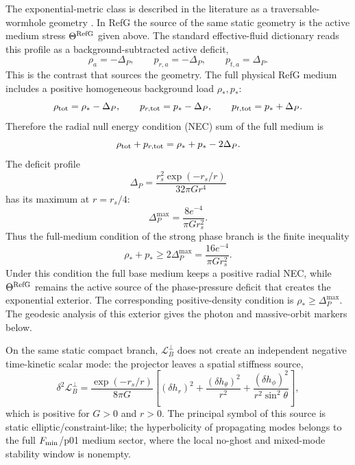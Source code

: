 \documentclass[12pt]{article}
\begin{document}
The exponential-metric class is described in the literature as a traversable-wormhole geometry \cite{Boonserm2018}. In RefG the source of the same static geometry is the active medium stress $\Theta^{\rm RefG}$ given above. The standard effective-fluid dictionary reads this profile as a background-subtracted active deficit,
\begin{equation}
\rho_a=-\Delta_P,\qquad p_{r,a}=-\Delta_P,\qquad p_{t,a}=\Delta_P .
\end{equation}
This is the contrast that sources the geometry. The full physical RefG medium includes a positive homogeneous background load $\rho_\ast,p_\ast$:
\begin{equation}
\rho_{\rm tot}=\rho_\ast-\Delta_P,\qquad
p_{r,{\rm tot}}=p_\ast-\Delta_P,\qquad
p_{t,{\rm tot}}=p_\ast+\Delta_P .
\end{equation}
Therefore the radial null energy condition (NEC) sum of the full medium is
\begin{equation}
\rho_{\rm tot}+p_{r,{\rm tot}}=\rho_\ast+p_\ast-2\Delta_P .
\end{equation}
The deficit profile
\begin{equation}
\Delta_P=\frac{r_s^2\exp(-r_s/r)}{32\pi G r^4}
\end{equation}
has its maximum at $r=r_s/4$:
\begin{equation}
\Delta_P^{\max}=\frac{8e^{-4}}{\pi G r_s^2}.
\end{equation}
Thus the full-medium condition of the strong phase branch is the finite inequality
\begin{equation}
\rho_\ast+p_\ast\ge 2\Delta_P^{\max}
=\frac{16e^{-4}}{\pi G r_s^2}.
\end{equation}
Under this condition the full base medium keeps a positive radial NEC, while $\Theta^{\rm RefG}$ remains the active source of the phase-pressure deficit that creates the exponential exterior. The corresponding positive-density condition is $\rho_\ast\ge\Delta_P^{\max}$. The geodesic analysis of this exterior gives the photon and massive-orbit markers below.

On the same static compact branch, $\mathcal L_B^\perp$ does not create an independent negative time-kinetic scalar mode: the projector leaves a spatial stiffness source,
\begin{equation}
\delta^2\mathcal L_B^\perp
=\frac{\exp(-r_s/r)}{8\pi G}
\left[
(\delta h_r)^2+\frac{(\delta h_\theta)^2}{r^2}
+\frac{(\delta h_\phi)^2}{r^2\sin^2\theta}
\right],
\end{equation}
which is positive for $G>0$ and $r>0$. The principal symbol of this source is static elliptic/constraint-like; the hyperbolicity of propagating modes belongs to the full $F_{\rm min}$/p01 medium sector, where the local no-ghost and mixed-mode stability window is nonempty.
\end{document}
